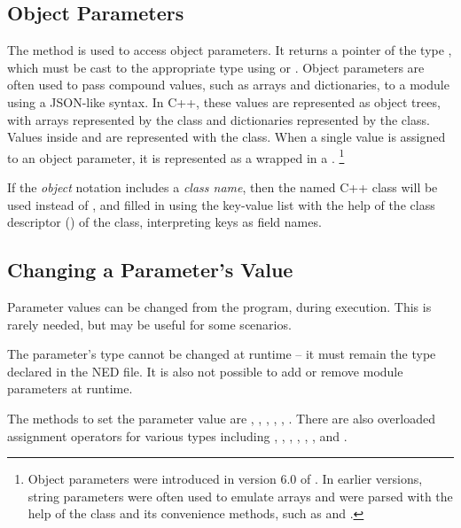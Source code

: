 \subsection{Object Parameters}
\label{sec:simple-modules:object-parameters}

The method  is used to access object parameters. It returns a
pointer of the type , which must be cast to the appropriate type
using  or . Object parameters are
often used to pass compound values, such as arrays and dictionaries, to a module
using a JSON-like syntax. In C++, these values are represented as object trees,
with arrays represented by the  class and dictionaries
represented by the  class. Values inside 
and  are represented with the  class. When a
single value is assigned to an object parameter, it is represented as a
 wrapped in a . \footnote{Object parameters
were introduced in version 6.0 of {\opp}. In earlier versions, string parameters
were often used to emulate arrays and were parsed with the help of the
 class and its convenience methods, such as
 and .}

If the \textit{object} notation includes a \textit{class name}, then the named C++ class
will be used instead of , and filled in using the key-value list
with the help of the class descriptor () of the class,
interpreting keys as field names.


\subsection{Changing a Parameter's Value}
\label{sec:simple-modules:setting-parameters}

Parameter values can be changed from the program, during execution.
This is rarely needed, but may be useful for some scenarios.

\begin{note}
    The parameter's type cannot be changed at runtime -- it must
    remain the type declared in the NED file. It is also not possible
    to add or remove module parameters at runtime.
\end{note}

The methods to set the parameter value are ,
, ,
, , .
There are also overloaded assignment operators for various types including
, , , , ,
, and .

